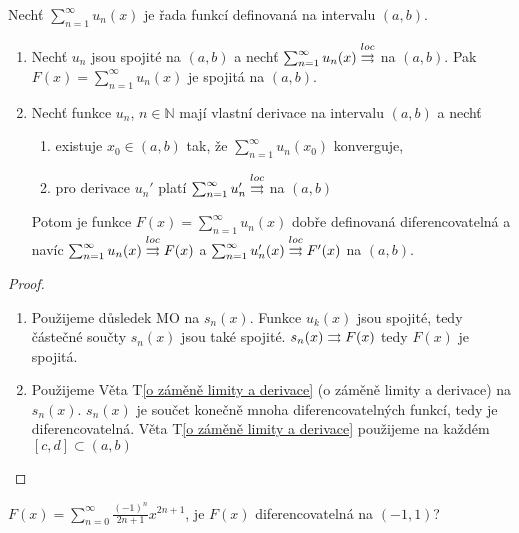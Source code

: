 \begin{vetal}
\label{o spojitosti a derivování řad funkcí}
Nechť $\sum_{n=1}^{\infty} u_n (x)$ je řada funkcí definovaná na intervalu $(a,b)$.
\begin{enumerate}
\item Nechť $u_n$ jsou spojité na $(a,b)$ a nechť $\sum_{n=1}^{\infty} u_n (x) \overset{loc}{\rightrightarrows}$ na $(a,b)$. Pak $F (x) = \sum_{n=1}^{\infty} u_n (x)$ je spojitá na $(a,b)$.
\item Nechť funkce $u_n$, $n \in \mathbb{N}$ mají vlastní derivace na intervalu $(a,b)$ a nechť
	\begin{enumerate}
	\item existuje $x_0 \in (a,b)$ tak, že $\sum_{n=1}^{\infty} u_n (x_0)$ konverguje,
	\item pro derivace $u_n'$ platí $\sum_{n=1}^{\infty} u_n' \overset{loc}{\rightrightarrows}$ na $(a,b)$
	\end{enumerate}
Potom je funkce $F(x) = \sum_{n=1}^{\infty} u_n (x)$ dobře definovaná diferencovatelná a navíc $\sum_{n=1}^{\infty} u_n (x) \overset{loc}{\rightrightarrows} F(x)$ a $\sum_{n=1}^{\infty} u'_n (x) \overset{loc}{\rightrightarrows} F'(x)$ na $(a,b)$.
\end{enumerate}
\end{vetal}
\begin{proof}
\begin{enumerate}

\item Použijeme důsledek MO na $s_n(x) $. Funkce $u_k(x)$ jsou spojité, tedy částečné součty $s_n(x)$ jsou také spojité. $s_n(x) \rightrightarrows F(x)$ tedy $F(x)$ je spojitá.
\item Použijeme Věta T\ref{o záměně limity a derivace} (o záměně limity a derivace) na $s_n(x)$. $s_n(x)$ je součet konečně mnoha diferencovatelných funkcí, tedy je diferencovatelná. Věta T\ref{o záměně limity a derivace} použijeme na každém $[c,d] \subset (a,b)$
\end{enumerate}
\end{proof}

\begin{priklad}
$F(x) = \sum_{n=0}^\infty \frac{(-1)^n}{2n+1} x^{2n+1}$, je $F(x)$ diferencovatelná na $(-1,1)$?
\end{priklad}

